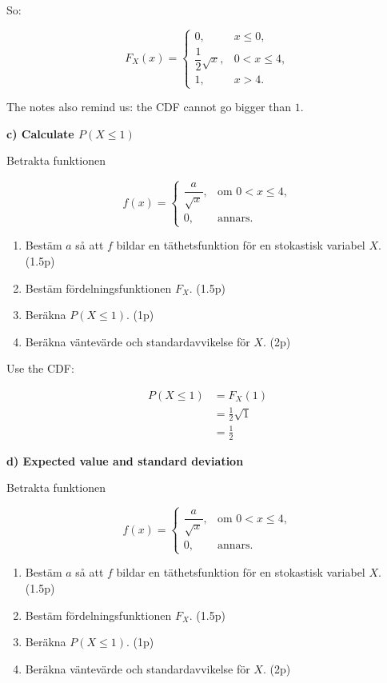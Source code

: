 \documentclass[10pt]{article}
\begin{document}
So:

\[
F_X(x)=
\begin{cases}
0,
& x\leq 0,\\
\dfrac{1}{2}\sqrt{x},
& 0<x\leq 4,\\
1,
& x>4.
\end{cases}
\]

The notes also remind us:
the CDF cannot go bigger than $1$.

\textbf{c) Calculate $P(X\leq 1)$}

Betrakta funktionen

\[
f(x)=
\begin{cases}
\dfrac{a}{\sqrt{x}},
& \text{om } 0<x\leq 4,\\
0,
& \text{annars.}
\end{cases}
\]

\begin{enumerate}[label=\alph*)]
\item
Bestäm $a$ så att $f$ bildar en täthetsfunktion för en stokastisk
variabel $X$.
\hfill (1.5p)

\item
Bestäm fördelningsfunktionen $F_X$.
\hfill (1.5p)

\item
Beräkna $P(X\leq 1)$.
\hfill (1p)

\item
Beräkna väntevärde och standardavvikelse för $X$.
\hfill (2p)
\end{enumerate}

Use the CDF:

\begin{align*}
P(X\leq 1)
&=
F_X(1) \\[2mm]
&=
\frac{1}{2}\sqrt{1} \\[2mm]
&=
\frac{1}{2}
\end{align*}

\textbf{d) Expected value and standard deviation}

Betrakta funktionen

\[
f(x)=
\begin{cases}
\dfrac{a}{\sqrt{x}},
& \text{om } 0<x\leq 4,\\
0,
& \text{annars.}
\end{cases}
\]

\begin{enumerate}[label=\alph*)]
\item
Bestäm $a$ så att $f$ bildar en täthetsfunktion för en stokastisk
variabel $X$.
\hfill (1.5p)

\item
Bestäm fördelningsfunktionen $F_X$.
\hfill (1.5p)

\item
Beräkna $P(X\leq 1)$.
\hfill (1p)

\item
Beräkna väntevärde och standardavvikelse för $X$.
\hfill (2p)
\end{enumerate}
\end{document}
